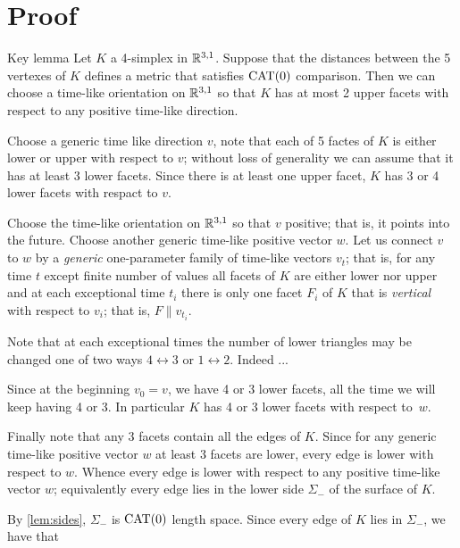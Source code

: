 \documentclass{article}
\begin{document}
\section{Proof}


\begin{thm}{Key lemma}
Let $K$ a 4-simplex in $\mathbb{R}^{3,1}$.
Suppose that the distances between the 5 vertexes of $K$ defines a metric that satisfies $\mathrm{CAT}(0)$ comparison.
Then we can choose a time-like orientation on $\mathbb{R}^{3,1}$ so that $K$ has at most 2 upper facets with respect to any positive time-like direction.
\end{thm}

Choose a generic time like direction $v$, note that each of 5 factes of $K$ is either lower or upper with respect to $v$;
without loss of generality we can assume that it has at least 3 lower facets.
Since there is at least one upper facet, $K$ has 3 or 4 lower facets with respact to $v$.

Choose the time-like orientation on $\mathbb{R}^{3,1}$ so that $v$ positive; that is, it points into the future.
Choose another generic time-like positive vector $w$.
Let us connect $v$ to $w$ by a \emph{generic} one-parameter family of time-like vectors $v_t$;
that is, for any time $t$ except finite number of values all facets of $K$ are either lower nor upper and at each exceptional time $t_i$ there is only one facet $F_i$ of $K$ that is \emph{vertical} with respect to $v_i$; that is, $F\parallel v_{t_i}$.

Note that at each exceptional times the number of lower triangles may be changed one of two ways $4\leftrightarrow 3$ or $1\leftrightarrow 2$.
Indeed ...

Since at the beginning $v_0=v$, we have 4 or 3 lower facets,
all the time we will keep having 4 or 3.
In particular $K$ has  4 or 3 lower facets with respect to~$w$.

Finally note that any 3 facets contain all the edges of $K$.
Since for any generic time-like positive vector $w$ at least 3 facets are lower,
every edge is lower with respect to $w$.
Whence every edge is lower with respect to any positive time-like vector $w$;
equivalently every edge lies in the lower side $\Sigma_-$ of the surface of $K$.

By \ref{lem:sides}, $\Sigma_-$ is $\mathrm{CAT}(0)$ length space.
Since every edge of $K$ lies in $\Sigma_-$, we have that 
\qeds

{\sloppy
\printbibliography[heading=bibintoc]
\fussy
}
\end{document}
